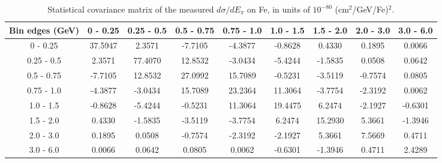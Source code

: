 \documentclass[aps,prl,twocolumn,superscriptaddress,nofootinbib]{revtex4-1}
\begin{document}
\begin{table}[h!]
  \centering
  \caption{Statistical covariance matrix of the measured $d\sigma/dE_{\pi}$ on Fe, in units of $10^{-80}$ (cm$^{2}$/GeV/Fe)$^{2}$.}
    \begin{tabular}{c||cccccccc}
      Bin edges (GeV) & 0 - 0.25 & 0.25 - 0.5 & 0.5 - 0.75 & 0.75 - 1.0 & 1.0 - 1.5 & 1.5 - 2.0 & 2.0 - 3.0 & 3.0 - 6.0 \\
\hline \hline
        0 - 0.25 & 37.5947 &  2.3571 & -7.7105 & -4.3877 & -0.8628 &  0.4330 &  0.1895 &  0.0066 \\
      0.25 - 0.5 &  2.3571 & 77.4070 & 12.8532 & -3.0434 & -5.4244 & -1.5835 &  0.0508 &  0.0642 \\
      0.5 - 0.75 & -7.7105 & 12.8532 & 27.0992 & 15.7089 & -0.5231 & -3.5119 & -0.7574 &  0.0805 \\
      0.75 - 1.0 & -4.3877 & -3.0434 & 15.7089 & 23.2364 & 11.3064 & -3.7754 & -2.3192 &  0.0062 \\
       1.0 - 1.5 & -0.8628 & -5.4244 & -0.5231 & 11.3064 & 19.4475 &  6.2474 & -2.1927 & -0.6301 \\
       1.5 - 2.0 &  0.4330 & -1.5835 & -3.5119 & -3.7754 &  6.2474 & 15.2930 &  5.3661 & -1.3946 \\
       2.0 - 3.0 &  0.1895 &  0.0508 & -0.7574 & -2.3192 & -2.1927 &  5.3661 &  7.5669 &  0.4711 \\
       3.0 - 6.0 &  0.0066 &  0.0642 &  0.0805 &  0.0062 & -0.6301 & -1.3946 &  0.4711 &  2.4289 \\
    \end{tabular}
  \label{tablecov:Fe_Statistical_Epi}
\end{table}
\end{document}
